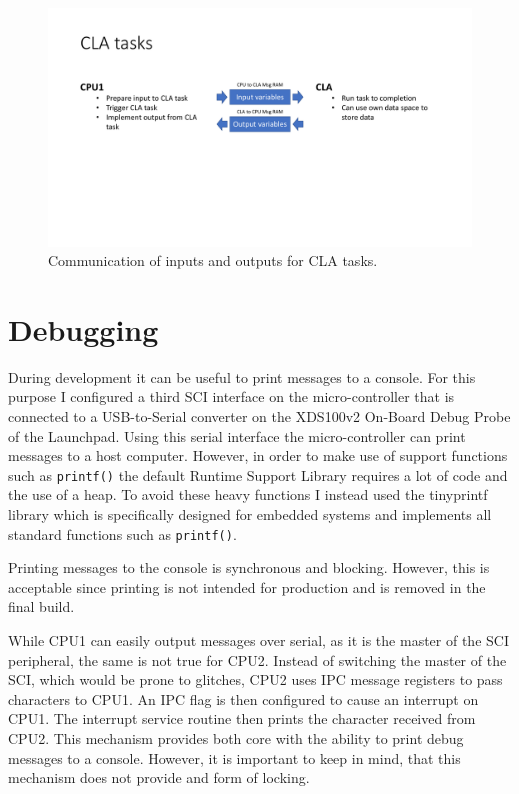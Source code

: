 \begin{figure}[H]
    \centering \includegraphics[width=1.0\textwidth]{./figures/CLA_communication.pdf}
    \caption{Communication of inputs and outputs for CLA tasks.}
    \label{fig:CLA_communication}
\end{figure}

\section{Debugging}

During development it can be useful to print messages to a console. For this purpose I configured a third SCI interface on the micro-controller that is connected to a USB-to-Serial converter on the XDS100v2 On-Board Debug Probe of the Launchpad. Using this serial interface the micro-controller can print messages to a host computer. However, in order to make use of support functions such as \texttt{printf()} the default Runtime Support Library requires a lot of code and the use of a heap. To avoid these heavy functions I instead used the tinyprintf library\cite{tinyprintf} which is specifically designed for embedded systems and implements all standard functions such as \texttt{printf()}.

Printing messages to the console is synchronous and blocking. However, this is acceptable since  printing is not intended for production and is removed in the final build.

While CPU1 can easily output messages over serial, as it is the master of the SCI peripheral, the same is not true for CPU2. Instead of switching the master of the SCI, which would be prone to glitches, CPU2 uses IPC message registers to pass characters to CPU1. An IPC flag is then configured to cause an interrupt on CPU1. The interrupt service routine then prints the character received from CPU2. This mechanism provides both core with the ability to print debug messages to a console. However, it is important to keep in mind, that this mechanism does not provide and form of locking.


